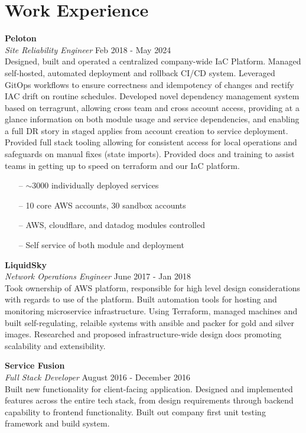 \section{Work Experience}

\large{\textbf{Peloton}} \\
\textit{Site Reliability Engineer} \hfill Feb 2018 - May 2024 \\[3.75pt]
Designed, built and operated a centralized company-wide IaC Platform. Managed self-hosted, automated deployment and rollback CI/CD system. Leveraged GitOps workflows to ensure correctness and idempotency of changes and rectify IAC drift on routine schedules. Developed novel dependency management system based on terragrunt, allowing cross team and cross account access, providing at a glance information on both module usage and service dependencies, and enabling a full DR story in staged applies from account creation to service deployment. Provided full stack tooling allowing for consistent access for local operations and safeguards on manual fixes (state imports). Provided docs and training to assist teams in getting up to speed on terraform and our IaC platform.


\begin{minipage}[t]{\linewidth}
    \begin{itemize}
        \item[--] $\sim$3000 individually deployed services
        \item[--] 10 core AWS accounts, 30 sandbox accounts
        \item[--] AWS, cloudflare, and datadog modules controlled
        \item[--] Self service of both module and deployment
    \end{itemize}
    \end{minipage}

\large{\textbf{LiquidSky}} \\
\textit{Network Operations Engineer} \hfill June 2017 - Jan 2018 \\[3.75pt]
Took ownership of AWS platform, responsible for high level design considerations with regards to use of the platform. Built automation tools for hosting and monitoring microservice infrastructure. Using Terraform, managed machines and built self-regulating, relaible systems with ansible and packer for gold and silver images. Researched and proposed infrastructure-wide design docs promoting scalability and extensibility.

\large{\textbf{Service Fusion}} \\
\textit{Full Stack Developer} \hfill August 2016 - December 2016 \\[3.75pt]
Built new functionality for client-facing application. Designed and implemented features across the entire tech stack, from design requirements through backend capability to frontend functionality. Built out company first unit testing framework and build system.

